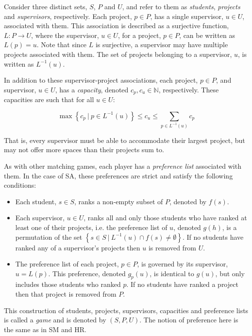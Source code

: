 \begin{definition}\label{def:sa_game}
    Consider three distinct sets, \(S\), \(P\) and \(U\), and refer to them as
    \emph{students}, \emph{projects} and \emph{supervisors}, respectively. Each
    project, \(p \in P\), has a single supervisor, \(u \in U\), associated with
    them. This association is described as a surjective function, \(L: P \to
    U\), where the supervisor, \(u \in U\), for a project, \(p \in P\), can be
    written as \(L(p) = u\). Note that since \(L\) is surjective, a supervisor
    may have multiple projects associated with them. The set of projects
    belonging to a supervisor, \(u\), is written as \(L^{-1}(u)\).

    In addition to these supervisor-project associations, each project, \(p \in
    P\), and supervisor, \(u \in U\), has a \emph{capacity}, denoted \(c_p, c_u
    \in \mathbb N\), respectively. These capacities are such that for all \(u
    \in U\):

    \begin{equation}
        \max \left\{c_p \ | \ p \in L^{-1}(u)\right\}
        \le c_u
        \le \sum_{p \in L^{-1}(u)} c_p
    \end{equation}

    That is, every supervisor must be able to accommodate their largest project,
    but may not offer more spaces than their projects sum to.

    As with other matching games, each player has a \emph{preference list}
    associated with them. In the case of SA, these preferences are strict and
    satisfy the following conditions:

    \begin{itemize}
        \item Each student, \(s \in S\), ranks a non-empty subset of \(P\),
            denoted by \(f(s)\).
        \item Each supervisor, \(u \in U\), ranks all and only those students
            who have ranked at least one of their projects, i.e. the preference
            list of \(u\), denoted \(g(h)\), is a permutation of the set
            \(\left\{s \in S \ | \ L^{-1}(u) \cap f(s) \neq \emptyset\right\}\).
            If no students have ranked any of a supervisor's projects then \(u\)
            is removed from \(U\).
        \item The preference list of each project, \(p \in P\), is governed by
            its supervisor, \(u = L(p)\). This preference, denoted \(g_p (u)\),
            is identical to \(g(u)\), but only includes those students who
            ranked \(p\). If no students have ranked a project then that project
            is removed from \(P\).
    \end{itemize}

    This construction of students, projects, supervisors, capacities and
    preference lists is called a \emph{game} and is denoted by \((S, P, U)\).
    The notion of preference here is the same as in SM and HR.
\end{definition}

